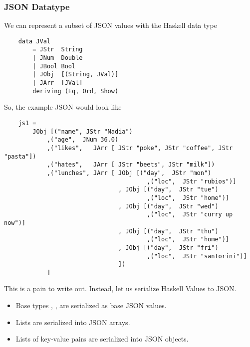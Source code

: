 \documentclass[letterpaper]{article}
\begin{document}
\subsubsection{JSON Datatype}
We can represent a subset of JSON values with the Haskell data type 
\begin{verbatim}
    data JVal 
        = JStr  String 
        | JNum  Double 
        | JBool Bool 
        | JObj  [(String, JVal)]
        | JArr  [JVal]
        deriving (Eq, Ord, Show)\end{verbatim}
So, the example JSON would look like 
\begin{verbatim}
    js1 =
        JObj [("name", JStr "Nadia")
            ,("age",  JNum 36.0)
            ,("likes",   JArr [ JStr "poke", JStr "coffee", JStr "pasta"])
            ,("hates",   JArr [ JStr "beets", JStr "milk"])
            ,("lunches", JArr [ JObj [("day",  JStr "mon")
                                        ,("loc",  JStr "rubios")]
                                , JObj [("day",  JStr "tue")
                                        ,("loc",  JStr "home")]
                                , JObj [("day",  JStr "wed")
                                        ,("loc",  JStr "curry up now")]
                                , JObj [("day",  JStr "thu")
                                        ,("loc",  JStr "home")]
                                , JObj [("day",  JStr "fri")
                                        ,("loc",  JStr "santorini")]
                                ])
            ]  \end{verbatim}
This is a pain to write out. Instead, let us serialize Haskell Values to JSON. 
\begin{itemize}
    \item Base types , ,  are serialized as base JSON values. 
    \item Lists are serialized into JSON arrays. 
    \item Lists of key-value pairs are serialized into JSON objects.
\end{itemize}
\end{document}

